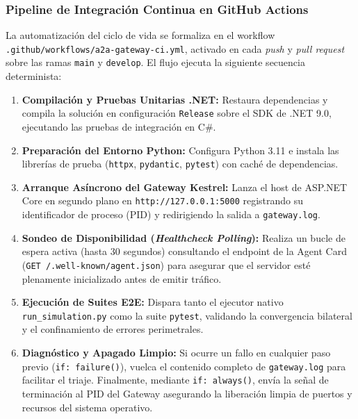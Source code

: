 \subsubsection{Pipeline de Integración Continua en GitHub Actions}
La automatización del ciclo de vida se formaliza en el workflow \texttt{.github/workflows/a2a-gateway-ci.yml}, activado en cada \textit{push} y \textit{pull request} sobre las ramas \texttt{main} y \texttt{develop}. El flujo ejecuta la siguiente secuencia determinista:
\begin{enumerate}
    \item \textbf{Compilación y Pruebas Unitarias .NET:} Restaura dependencias y compila la solución en configuración \texttt{Release} sobre el SDK de .NET 9.0, ejecutando las pruebas de integración en C\#.
    \item \textbf{Preparación del Entorno Python:} Configura Python 3.11 e instala las librerías de prueba (\texttt{httpx}, \texttt{pydantic}, \texttt{pytest}) con caché de dependencias.
    \item \textbf{Arranque Asíncrono del Gateway Kestrel:} Lanza el host de ASP.NET Core en segundo plano en \texttt{http://127.0.0.1:5000} registrando su identificador de proceso (PID) y redirigiendo la salida a \texttt{gateway.log}.
    \item \textbf{Sondeo de Disponibilidad (\textit{Healthcheck Polling}):} Realiza un bucle de espera activa (hasta 30 segundos) consultando el endpoint de la Agent Card (\texttt{GET /.well-known/agent.json}) para asegurar que el servidor esté plenamente inicializado antes de emitir tráfico.
    \item \textbf{Ejecución de Suites E2E:} Dispara tanto el ejecutor nativo \texttt{run\_simulation.py} como la suite \texttt{pytest}, validando la convergencia bilateral y el confinamiento de errores perimetrales.
    \item \textbf{Diagnóstico y Apagado Limpio:} Si ocurre un fallo en cualquier paso previo (\texttt{if: failure()}), vuelca el contenido completo de \texttt{gateway.log} para facilitar el triaje. Finalmente, mediante \texttt{if: always()}, envía la señal de terminación al PID del Gateway asegurando la liberación limpia de puertos y recursos del sistema operativo.
\end{enumerate}

